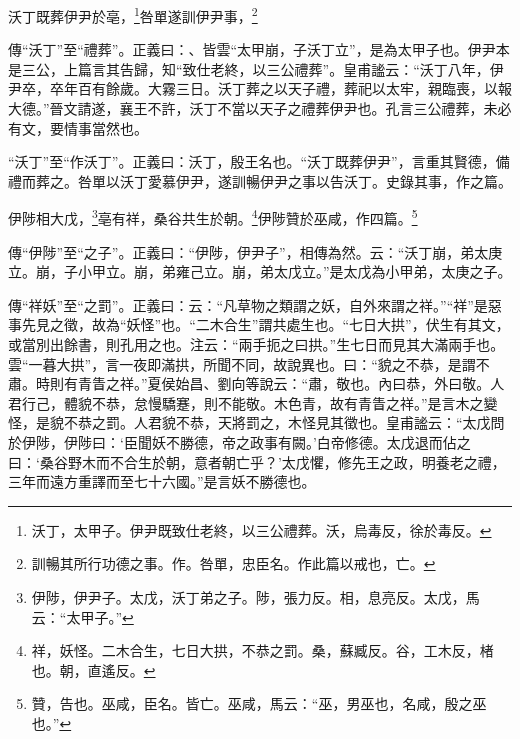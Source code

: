 沃丁既葬伊尹於亳，\footnote{沃丁，太甲子。伊尹既致仕老終，以三公禮葬。沃，烏毒反，徐於毒反。}咎單遂訓伊尹事，\footnote{訓暢其所行功德之事。作。咎單，忠臣名。作此篇以戒也，亡。}

{\noindent\zhuan{}\fzbyks 傳“沃丁”至“禮葬”。正義曰：、皆雲“太甲崩，子沃丁立”，是為太甲子也。伊尹本是三公，上篇言其告歸，知“致仕老終，以三公禮葬”。皇甫謐云：“沃丁八年，伊尹卒，卒年百有餘歲。大霧三日。沃丁葬之以天子禮，葬祀以太牢，親臨喪，以報大德。”晉文請遂，襄王不許，沃丁不當以天子之禮葬伊尹也。孔言三公禮葬，未必有文，要情事當然也。 \par}

{\noindent\shu{}\fzkt “沃丁”至“作沃丁”。正義曰：沃丁，殷王名也。“沃丁既葬伊尹”，言重其賢德，備禮而葬之。咎單以沃丁愛慕伊尹，遂訓暢伊尹之事以告沃丁。史錄其事，作之篇。 \par}

伊陟相大戊，\footnote{伊陟，伊尹子。太戊，沃丁弟之子。陟，張力反。相，息亮反。太戊，馬云：“太甲子。”}亳有祥，桑谷共生於朝。\footnote{祥，妖怪。二木合生，七日大拱，不恭之罰。桑，蘇臧反。谷，工木反，楮也。朝，直遙反。}伊陟贊於巫咸，作四篇。\footnote{贊，告也。巫咸，臣名。皆亡。巫咸，馬云：“巫，男巫也，名咸，殷之巫也。”}

{\noindent\zhuan{}\fzbyks 傳“伊陟”至“之子”。正義曰：“伊陟，伊尹子”，相傳為然。云：“沃丁崩，弟太庚立。崩，子小甲立。崩，弟雍己立。崩，弟太戊立。”是太戊為小甲弟，太庚之子。 \par}

{\noindent\zhuan{}\fzbyks 傳“祥妖”至“之罰”。正義曰：云：“凡草物之類謂之妖，自外來謂之祥。”“祥”是惡事先見之徵，故為“妖怪”也。“二木合生”謂共處生也。“七日大拱”，伏生有其文，或當別出餘書，則孔用之也。注云：“兩手扼之曰拱。”生七日而見其大滿兩手也。雲“一暮大拱”，言一夜即滿拱，所聞不同，故說異也。曰：“貌之不恭，是謂不肅。時則有青眚之祥。”夏侯始昌、劉向等說云：“肅，敬也。內曰恭，外曰敬。人君行己，體貌不恭，怠慢驕蹇，則不能敬。木色青，故有青眚之祥。”是言木之變怪，是貌不恭之罰。人君貌不恭，天將罰之，木怪見其徵也。皇甫謐云：“太戊問於伊陟，伊陟曰：‘臣聞妖不勝德，帝之政事有闕。’白帝修德。太戊退而佔之曰：‘桑谷野木而不合生於朝，意者朝亡乎？’太戊懼，修先王之政，明養老之禮，三年而遠方重譯而至七十六國。”是言妖不勝德也。 \par}


